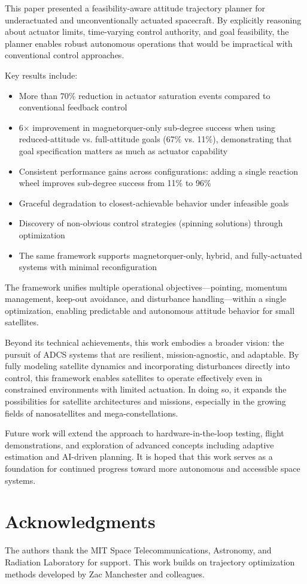 \documentclass[conference]{IEEEtran}
\begin{document}
This paper presented a feasibility-aware attitude trajectory planner for underactuated and unconventionally actuated spacecraft. By explicitly reasoning about actuator limits, time-varying control authority, and goal feasibility, the planner enables robust autonomous operations that would be impractical with conventional control approaches.

Key results include:
\begin{itemize}
    \item More than 70\% reduction in actuator saturation events compared to conventional feedback control
    \item 6$\times$ improvement in magnetorquer-only sub-degree success when using reduced-attitude vs. full-attitude goals (67\% vs. 11\%), demonstrating that goal specification matters as much as actuator capability
    \item Consistent performance gains across configurations: adding a single reaction wheel improves sub-degree success from 11\% to 96\%
    \item Graceful degradation to closest-achievable behavior under infeasible goals
    \item Discovery of non-obvious control strategies (spinning solutions) through optimization
    \item The same framework supports magnetorquer-only, hybrid, and fully-actuated systems with minimal reconfiguration
\end{itemize}

The framework unifies multiple operational objectives---pointing, momentum management, keep-out avoidance, and disturbance handling---within a single optimization, enabling predictable and autonomous attitude behavior for small satellites.

Beyond its technical achievements, this work embodies a broader vision: the pursuit of ADCS systems that are resilient, mission-agnostic, and adaptable. By fully modeling satellite dynamics and incorporating disturbances directly into control, this framework enables satellites to operate effectively even in constrained environments with limited actuation. In doing so, it expands the possibilities for satellite architectures and missions, especially in the growing fields of nanosatellites and mega-constellations.

Future work will extend the approach to hardware-in-the-loop testing, flight demonstrations, and exploration of advanced concepts including adaptive estimation and AI-driven planning. It is hoped that this work serves as a foundation for continued progress toward more autonomous and accessible space systems.

\section*{Acknowledgments}
The authors thank the MIT Space Telecommunications, Astronomy, and Radiation Laboratory for support. This work builds on trajectory optimization methods developed by Zac Manchester and colleagues.



\end{document}

